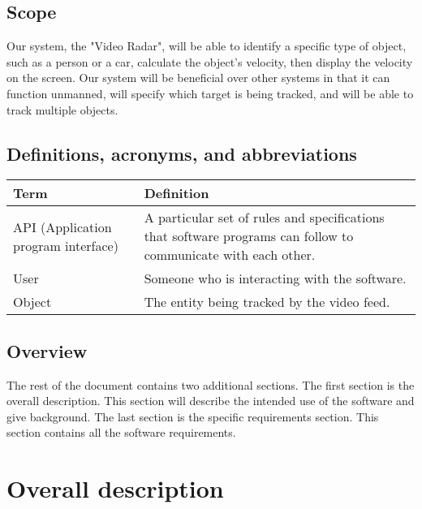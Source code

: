 \documentclass[letterpaper,10pt,onecolumn,draftclsnofoot]{IEEEtran}
\begin{document}
\subsection{Scope}
Our system, the "Video Radar", will be able to identify a specific type of object, such as a person or a car, calculate the object's velocity, then display the velocity on the screen.
Our system will be beneficial over other systems in that it can function unmanned, will specify which target is being tracked, and will be able to track multiple objects.
\subsection{Definitions, acronyms, and abbreviations}
\begin{tabular}{|p{4cm}|p{12cm}|}
	\hline
	\textbf{Term} & \textbf{Definition} \\
	\hline
	API (Application program interface) & A particular set of rules and specifications that software programs can follow to communicate with each other. \\
	\hline
	User & Someone who is interacting with the software. \\
	\hline
	Object & The entity being tracked by the video feed.  \\
	\hline
	
\end{tabular}



\subsection{Overview}
The rest of the document contains two additional sections.
The first section is the overall description.
This section will describe the intended use of the software and give background.
The last section is the specific requirements section.
This section contains all the software requirements.

\section{Overall description}
\end{document}
